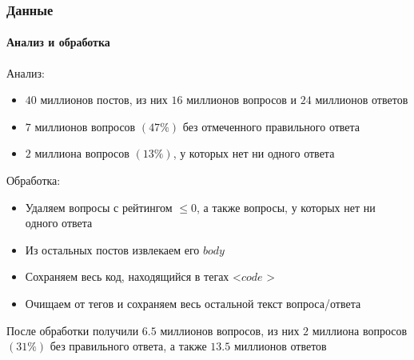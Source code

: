 \documentclass[10pt]{beamer}
\begin{document}

\begin{frame}
\frametitle{Данные}
\framesubtitle{Анализ и обработка}

Анализ:
\begin{itemize}
	\item $40$ миллионов постов, из них $16$ миллионов вопросов и $24$ миллионов ответов
	\item $7$ миллионов вопросов $(47\%)$ без отмеченного правильного ответа
	\item $2$ миллиона вопросов $(13\%)$, у которых нет ни одного ответа
\end{itemize}

Обработка:
\begin{itemize}
	\item Удаляем вопросы с рейтингом $\leqslant 0$, а также вопросы, у которых нет ни одного ответа
	\item Из остальных постов извлекаем его $body$
	\item Сохраняем весь код, находящийся в тегах \textless $code$ \textgreater
	\item Очищаем от тегов и сохраняем весь остальной текст вопроса/ответа
\end{itemize}

После обработки получили $6.5$ миллионов вопросов, из них $2$ миллиона вопросов $(31\%)$ без правильного ответа, а также $13.5$ миллионов ответов

\end{frame}

\end{document}

